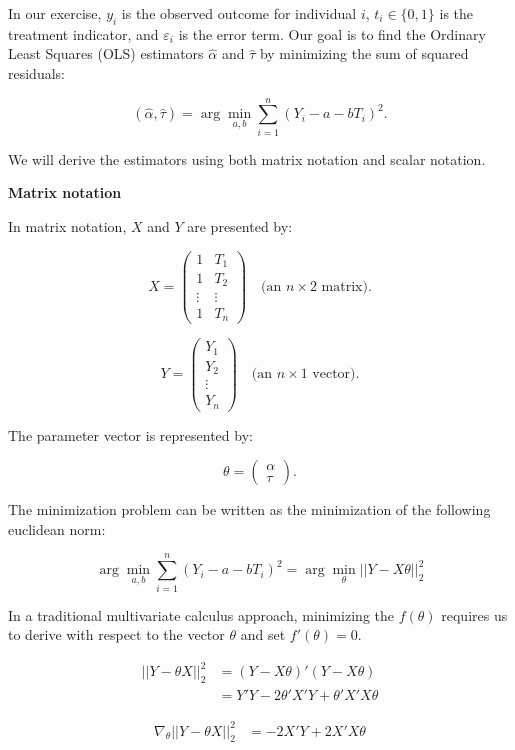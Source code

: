 \documentclass{article}
\begin{document}
In our exercise, \(y_i\) is the observed outcome for individual \(i\), \(t_i \in \{0, 1\}\) is the treatment indicator, and \(\varepsilon_i\) is the error term. Our goal is to find the Ordinary Least Squares (OLS) estimators \(\hat{\alpha}\) and \(\hat{\tau}\) by minimizing the sum of squared residuals:

\[
(\hat{\alpha}, \hat{\tau}) = \arg\min_{a, b} \sum_{i=1}^{n} (Y_i - a - b T_i)^2.
\]

We will derive the estimators using both matrix notation and scalar notation.

\textbf{Matrix notation}

In matrix notation, $X$ and $Y$ are presented by:

\[
X = \begin{pmatrix}
1 & T_1 \\
1 & T_2 \\
\vdots & \vdots \\
1 & T_n
\end{pmatrix} \quad \text{(an } n \times 2 \text{ matrix)}.
\]

\[
Y = \begin{pmatrix}
Y_1 \\
Y_2 \\
\vdots \\
Y_n
\end{pmatrix} \quad \text{(an } n \times 1 \text{ vector)}.
\]

The parameter vector is represented by:

\[
\theta = \begin{pmatrix}
\alpha \\
\tau
\end{pmatrix}.
\]

The minimization problem can be written as the minimization of the following euclidean norm:

$$
\arg\min_{a, b} \sum_{i=1}^{n} (Y_i - a - b T_i)^2 = \arg\min_{\theta} || Y - X \theta ||^2_2
$$

In a traditional multivariate calculus approach, minimizing the $f(\theta)$ requires us to derive with respect to the vector $\theta$ and set $f'(\theta) = 0$. 


\begin{align*}
  || Y - \theta X ||^2_2 &= (Y - X \theta)' (Y - X \theta) \\
                         &= Y' Y - 2 \theta' X' Y + \theta' X' X \theta
\end{align*}

\begin{align*}
  \nabla_{\theta} || Y - \theta X ||^2_2 &= - 2 X' Y + 2 X' X \theta
\end{align*}
\end{document}
